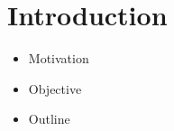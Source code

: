 \chapter{Introduction}

\begin{itemize}
    \item Motivation
    \item Objective
    \item Outline
\end{itemize}